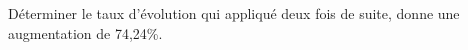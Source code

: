 
Déterminer le taux d'évolution qui appliqué deux fois de suite, donne une augmentation de 74,24\%. 